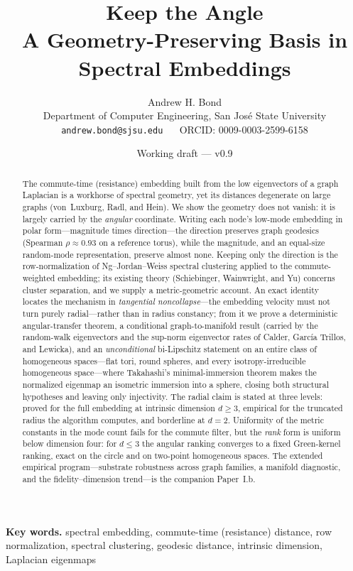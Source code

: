 \documentclass[11pt]{article}
\title{\textbf{Keep the Angle}\\[2pt]
\large A Geometry-Preserving Basis in Spectral Embeddings}
\author{Andrew H. Bond\\
Department of Computer Engineering, San Jos\'e State University\\
\texttt{andrew.bond@sjsu.edu} ~\textbar~ ORCID: 0009-0003-2599-6158}
\date{Working draft --- v0.9}
\theoremstyle{remark}
\begin{document}
\maketitle

\begin{abstract}
The commute-time (resistance) embedding built from the low eigenvectors of a
graph Laplacian is a workhorse of spectral geometry, yet its distances degenerate
on large graphs (von~Luxburg, Radl, and Hein). We show the geometry does not
vanish: it is largely carried by the \emph{angular} coordinate. Writing each
node's low-mode embedding in polar form---magnitude times direction---the
direction preserves graph geodesics (Spearman $\rho\approx0.93$ on a reference
torus), while the magnitude, and an equal-size random-mode representation,
preserve almost none. Keeping only the direction is the row-normalization of
Ng--Jordan--Weiss spectral clustering applied to the commute-weighted embedding;
its existing theory (Schiebinger, Wainwright, and Yu) concerns cluster
separation, and we supply a metric-geometric account. An exact identity locates
the mechanism in \emph{tangential noncollapse}---the embedding velocity must not
turn purely radial---rather than in radius constancy; from it we prove a
deterministic angular-transfer theorem, a conditional graph-to-manifold result
(carried by the random-walk eigenvectors and the sup-norm eigenvector rates of
Calder, Garc\'ia Trillos, and Lewicka), and an \emph{unconditional} bi-Lipschitz
statement on an entire class of homogeneous spaces---flat tori, round spheres,
and every isotropy-irreducible homogeneous space---where Takahashi's
minimal-immersion theorem makes the normalized eigenmap an isometric immersion
into a sphere, closing both structural hypotheses and leaving only injectivity.
The radial claim is stated at three levels: proved
for the full embedding at intrinsic dimension $d\ge3$, empirical for the
truncated radius the algorithm computes, and borderline at $d=2$. Uniformity of
the metric constants in the mode count fails for the commute filter, but the
\emph{rank} form is uniform below dimension four: for $d\le3$ the angular ranking
converges to a fixed Green-kernel ranking, exact on the circle and on two-point
homogeneous spaces. The extended empirical program---substrate robustness across
graph families, a manifold diagnostic, and the fidelity--dimension trend---is the
companion Paper~I.b.
\end{abstract}

\noindent\textbf{Key words.} spectral embedding, commute-time (resistance) distance, row normalization, spectral clustering, geodesic distance, intrinsic dimension, Laplacian eigenmaps
\end{document}
